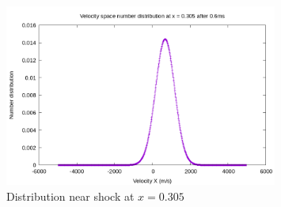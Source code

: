 \documentclass[paper=a4, fontsize=12pt]{scrartcl}
\begin{document}
\begin{figure}[H]
        \centering
        \includegraphics[width=0.8\textwidth]{center_shock-m}
        \caption{Distribution near shock at $x = 0.305$ }
        \label{fig:center_shock-m}
\end{figure}
\end{document}
